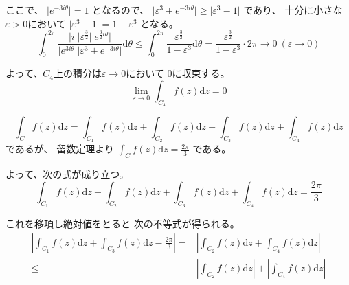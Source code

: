\documentclass[12pt,b5paper]{ltjsarticle}
\begin{document}
ここで、
$\lvert e^{-3i\theta}\rvert =1$
となるので、
$\lvert \varepsilon^3  + e^{-3i\theta} \rvert \geq \lvert \varepsilon^3-1 \rvert $
であり、
十分に小さな$\varepsilon>0$において
$\lvert \varepsilon^3-1 \rvert =1-\varepsilon^3$
となる。
\begin{equation}
 \int_{0}^{2\pi} \frac{\lvert i \rvert \lvert \varepsilon^{\frac{3}{2}}\rvert \lvert e^{\frac{3}{2}i\theta}\rvert}{\lvert e^{3i\theta}\rvert \lvert \varepsilon^3  + e^{-3i\theta} \rvert} \mathrm{d}\theta
  \leq
  \int_{0}^{2\pi} \frac{\varepsilon^{\frac{3}{2}}}{1- \varepsilon^3} \mathrm{d}\theta
  =\frac{\varepsilon^{\frac{3}{2}}}{1- \varepsilon^3}\cdot 2\pi \to 0 \ (\varepsilon\to0)
\end{equation}

よって、$C_4$上の積分は$\varepsilon\to0$において
$0$に収束する。
\begin{equation}
 \lim_{\varepsilon\to 0}\int_{C_4}f(z)\mathrm{d}z=0
\end{equation}


\begin{equation}
 \int_{C} f(z)\mathrm{d}z
  =
 \int_{C_1} f(z)\mathrm{d}z
 +
 \int_{C_2} f(z)\mathrm{d}z
 +
 \int_{C_3} f(z)\mathrm{d}z
 +
 \int_{C_4} f(z)\mathrm{d}z
\end{equation}
であるが、
留数定理より
$\int_{C} f(z)\mathrm{d}z = \frac{2\pi}{3}$
である。

よって、次の式が成り立つ。
\begin{equation}
 \int_{C_1} f(z)\mathrm{d}z
 +
 \int_{C_2} f(z)\mathrm{d}z
 +
 \int_{C_3} f(z)\mathrm{d}z
 +
 \int_{C_4} f(z)\mathrm{d}z
 = \frac{2\pi}{3}
\end{equation}

これを移項し絶対値をとると
次の不等式が得られる。
\begin{align}
 \left\lvert
 \int_{C_1} f(z)\mathrm{d}z
 +
 \int_{C_3} f(z)\mathrm{d}z
 - \frac{2\pi}{3}
 \right\rvert
 = &
  \left\lvert
  \int_{C_2} f(z)\mathrm{d}z
  +
  \int_{C_4} f(z)\mathrm{d}z
 \right\rvert\\
  \leq &
  \left\lvert
  \int_{C_2} f(z)\mathrm{d}z
   \right\rvert
  +  \left\lvert
  \int_{C_4} f(z)\mathrm{d}z
 \right\rvert
\end{align}
\end{document}
